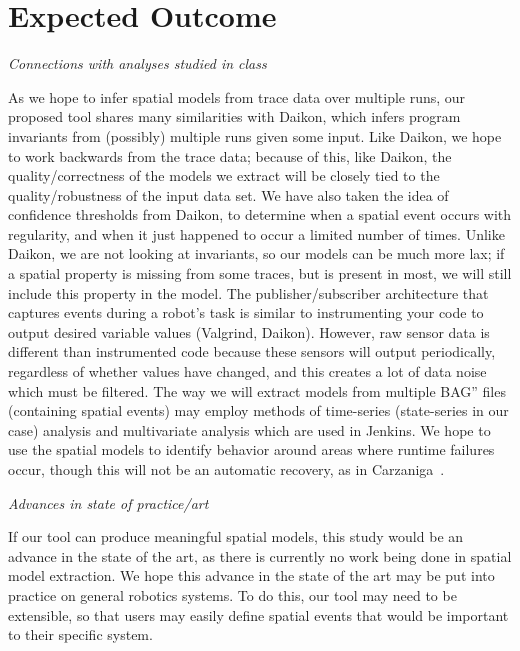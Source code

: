 \section{Expected Outcome} 

\emph{Connections with analyses studied in class}

As we hope to infer spatial models from trace data over multiple runs, our proposed tool shares many similarities with Daikon, which infers program invariants from (possibly) multiple runs given some input.
Like Daikon, we hope to work backwards from the trace data; because of this, like Daikon, the quality/correctness of the models we extract will be closely tied to the quality/robustness of the input data set.
We have also taken the idea of confidence thresholds from Daikon, to determine when a spatial event occurs with regularity, and when it just happened to occur a limited number of times.
Unlike Daikon, we are not looking at invariants, so our models can be much more lax; if a spatial property is missing from some traces, but is present in most, we will still include this property in the model.
The publisher/subscriber architecture that captures events during a robot's task is similar to instrumenting your code to output desired variable values (Valgrind, Daikon).
However, raw sensor data is different than instrumented code because these sensors will output periodically, regardless of whether values have changed, and this creates a lot of data noise which must be filtered.
The way we will extract models from multiple BAG'' files (containing spatial events) may employ methods of time-series (state-series in our case) analysis and multivariate analysis which are used in Jenkins.  
We hope to use the spatial models to identify behavior around areas where runtime failures occur, though this will not be an automatic recovery, as in Carzaniga~\etal.

\emph{Advances in state of practice/art}

If our tool can produce meaningful spatial models, this study would be an advance in the state of the art, as there is currently no work being done in spatial model extraction.
We hope this advance in the state of the art may be put into practice on general robotics systems. 
To do this, our tool may need to be extensible, so that users may easily define spatial events that would be important to their specific system.
